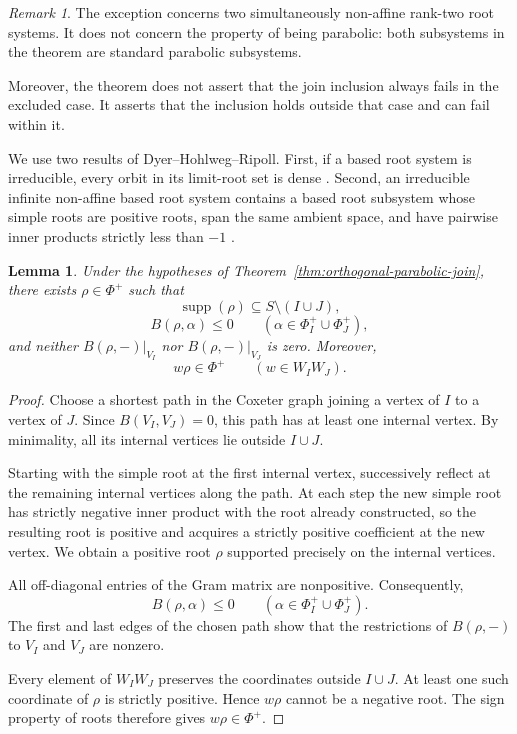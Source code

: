 \documentclass[11pt,reqno]{amsart}
\theoremstyle{plain}
\newtheorem{lemma}[theorem]{Lemma}
\theoremstyle{definition}
\theoremstyle{remark}
\newtheorem{remark}[theorem]{Remark}
\numberwithin{equation}{section}
\begin{document}
\begin{remark}\label{rem:meaning-of-exception}
The exception concerns two simultaneously non-affine rank-two
root systems. It does not concern the property of being parabolic:
both subsystems in the theorem are standard parabolic subsystems.

Moreover, the theorem does not assert that the join inclusion
always fails in the excluded case. It asserts that the inclusion
holds outside that case and can fail within it.
\end{remark}

We use two results of Dyer--Hohlweg--Ripoll. First, if a based root
system is irreducible, every orbit in its limit-root set is dense
\cite[Theorem~3.1]{DHR}. Second, an irreducible infinite non-affine
based root system contains a based root subsystem whose simple
roots are positive roots, span the same ambient space, and have
pairwise inner products strictly less than $-1$
\cite[Proposition~6.4]{DHR}.

\begin{lemma}\label{lem:connecting-root}
Under the hypotheses of Theorem~\ref{thm:orthogonal-parabolic-join},
there exists $\rho\in\Phi^+$ such that
\[
\operatorname{supp}(\rho)\subseteq S\setminus(I\cup J),
\]
\[
B(\rho,\alpha)\le0
\qquad
(\alpha\in\Phi_I^+\cup\Phi_J^+),
\]
and neither $B(\rho,-)|_{V_I}$ nor $B(\rho,-)|_{V_J}$ is zero.
Moreover,
\[
w\rho\in\Phi^+
\qquad (w\in W_IW_J).
\]
\end{lemma}

\begin{proof}
Choose a shortest path in the Coxeter graph joining a vertex of
$I$ to a vertex of $J$. Since $B(V_I,V_J)=0$, this path has at least
one internal vertex. By minimality, all its internal vertices lie
outside $I\cup J$.

Starting with the simple root at the first internal vertex,
successively reflect at the remaining internal vertices along
the path. At each step the new simple root has strictly negative
inner product with the root already constructed, so the resulting
root is positive and acquires a strictly positive coefficient at
the new vertex. We obtain a positive root $\rho$ supported
precisely on the internal vertices.

All off-diagonal entries of the Gram matrix are nonpositive.
Consequently,
\[
B(\rho,\alpha)\le0
\qquad
(\alpha\in\Phi_I^+\cup\Phi_J^+).
\]
The first and last edges of the chosen path show that the
restrictions of $B(\rho,-)$ to $V_I$ and $V_J$ are nonzero.

Every element of $W_IW_J$ preserves the coordinates outside
$I\cup J$. At least one such coordinate of $\rho$ is strictly
positive. Hence $w\rho$ cannot be a negative root. The sign
property of roots therefore gives $w\rho\in\Phi^+$.
\end{proof}
\end{document}
